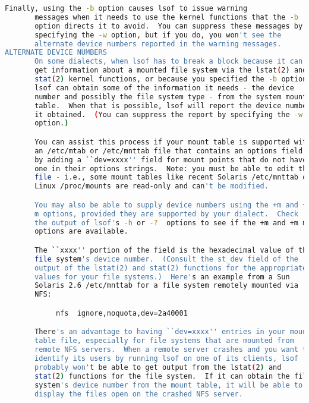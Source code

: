 {{\begin{lstlisting}[language=bash]
       Finally, using the -b option causes lsof to issue warning
       messages when it needs to use the kernel functions that the -b
       option directs it to avoid.  You can suppress these messages by
       specifying the -w option, but if you do, you won't see the
       alternate device numbers reported in the warning messages.
ALTERNATE DEVICE NUMBERS
       On some dialects, when lsof has to break a block because it can't
       get information about a mounted file system via the lstat(2) and
       stat(2) kernel functions, or because you specified the -b option,
       lsof can obtain some of the information it needs - the device
       number and possibly the file system type - from the system mount
       table.  When that is possible, lsof will report the device number
       it obtained.  (You can suppress the report by specifying the -w
       option.)

       You can assist this process if your mount table is supported with
       an /etc/mtab or /etc/mnttab file that contains an options field
       by adding a ``dev=xxxx'' field for mount points that do not have
       one in their options strings.  Note: you must be able to edit the
       file - i.e., some mount tables like recent Solaris /etc/mnttab or
       Linux /proc/mounts are read-only and can't be modified.

       You may also be able to supply device numbers using the +m and +m
       m options, provided they are supported by your dialect.  Check
       the output of lsof's -h or -?  options to see if the +m and +m m
       options are available.

       The ``xxxx'' portion of the field is the hexadecimal value of the
       file system's device number.  (Consult the st_dev field of the
       output of the lstat(2) and stat(2) functions for the appropriate
       values for your file systems.)  Here's an example from a Sun
       Solaris 2.6 /etc/mnttab for a file system remotely mounted via
       NFS:

            nfs  ignore,noquota,dev=2a40001

       There's an advantage to having ``dev=xxxx'' entries in your mount
       table file, especially for file systems that are mounted from
       remote NFS servers.  When a remote server crashes and you want to
       identify its users by running lsof on one of its clients, lsof
       probably won't be able to get output from the lstat(2) and
       stat(2) functions for the file system.  If it can obtain the file
       system's device number from the mount table, it will be able to
       display the files open on the crashed NFS server.


\end{lstlisting}}}
